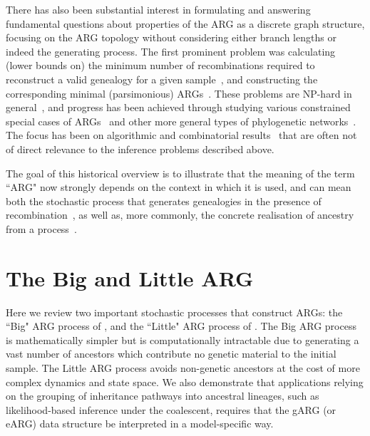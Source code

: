 \documentclass{article}
\begin{document}
There has also been substantial interest in formulating and answering
fundamental questions about properties
of the ARG as a discrete graph structure, focusing on the ARG topology without considering
either branch lengths or indeed the generating process.
The first prominent problem was calculating (lower bounds on) the minimum number of
recombinations required to reconstruct a valid genealogy for a given
sample~\citep{myers2003bounds}, and constructing the corresponding
minimal (parsimonious)
ARGs~\citep{song2003parsimonious,song2005efficient,lyngso2005minimum}.
These problems are NP-hard in general~\citep{wang2001perfect}, and progress has
been achieved through studying various constrained special cases of ARGs~\citep[e.g.][]{gusfield2004optimal} and
other more general types of phylogenetic networks~\citep{huson2010phylogenetic}. The
focus has been on algorithmic and combinatorial results~\citep{gusfield2014recombinatorics}
that are often not of
direct relevance to the inference problems described above.

The goal of this historical overview is to illustrate that the meaning of the term ``ARG" now strongly
depends on the context in which it is used, and can mean both the
stochastic process that generates genealogies in the presence of
recombination~\citep[e.g.][]{nordborg2000linkage,birkner2013ancestral,
wilton2015smc,griffiths2016coalescent},
as well as, more commonly, the concrete realisation of ancestry from a
process~\citep[e.g.][]{gusfield2014recombinatorics,mathieson2020ancestry,brandt2021evaluation}.

\section{The Big and Little ARG}
\label{sec-big-and-little-arg}
Here we review two important stochastic processes that construct ARGs:
the ``Big" ARG process of \cite{griffiths1997ancestral}, and the ``Little" ARG process of
 \cite{hudson1983properties}. The Big ARG process is mathematically simpler
 but is computationally intractable due to generating a vast number of ancestors
 which contribute no genetic material to the initial sample.
The Little ARG process avoids non-genetic ancestors at the cost of more complex
dynamics and state space. We also demonstrate that applications relying on the grouping of inheritance pathways into ancestral lineages, such as likelihood-based inference under the coalescent, requires that the
gARG (or eARG) data structure be interpreted in a model-specific way.
\end{document}
